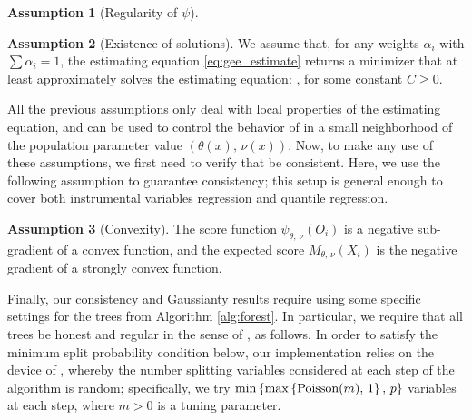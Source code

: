 \documentclass[aos]{imsart}
\theoremstyle{plain}
\theoremstyle{definition}
\newtheorem{assu}{Assumption}
\theoremstyle{remark}
\begin{document}
\begin{CJK}{UTF8}{gbsn}
\begin{assu}[Regularity of $\psi$]
\label{assu:donsker}
\end{assu}

\begin{assu}[Existence of solutions]
\label{assu:existence}
We assume that, for any weights $\alpha_i$ with $\sum \alpha_i = 1$,
the estimating equation \eqref{eq:gee_estimate} returns a
minimizer \smash{$(\htheta, \, \hnu)$} that at least approximately
solves the estimating equation:
,
for some constant $C \geq 0$.
\end{assu}

All the previous assumptions only deal with local properties of the estimating
equation, and can be used to control the behavior of 
in a small neighborhood of the population parameter value $(\theta(x), \, \nu(x))$.
Now, to make any use of these assumptions, we first need to verify that 
 be consistent. Here, we use the following assumption
to guarantee consistency; this setup is general enough to cover both instrumental
variables regression and quantile regression.

\begin{assu}[Convexity]
\label{assu:convexity}
The score function $\psi_{\theta, \, \nu}(O_i)$ is a negative sub-gradient of a convex function,
and the expected score $M_{\theta, \, \nu}(X_i)$ is the negative gradient of a strongly convex function.
\end{assu}

Finally, our consistency and Gaussianty results require using some specific settings
for the trees from Algorithm \ref{alg:forest}.
In particular, we require that all trees be honest and regular in the sense of \citet{wager2015estimation}, as follows.
In order to satisfy the minimum split probability condition below,
our implementation relies on the device of \citet{denil2014narrowing}, whereby the number splitting variables
considered at each step of the algorithm is random; specifically, we try
$\min\left\{\max\left\{\text{Poisson$(m)$}, \, 1\right\}, \, p\right\}$ variables at each step,
where $m > 0$ is a tuning parameter.


\end{CJK}
\end{document}
